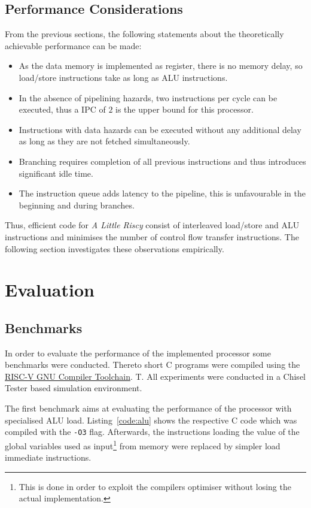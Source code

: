 \documentclass[conference]{IEEEtran}
\begin{document}
\subsection{Performance Considerations} \label{sec:performance}
From the previous sections, the following statements about the theoretically achievable performance can be made:
\begin{itemize}
	\item As the data memory is implemented as register, there is no memory delay, so load/store instructions take as long as ALU instructions.
	\item In the absence of pipelining hazards, two instructions per cycle can be executed, thus a IPC of $2$ is the upper bound for this processor.
	\item Instructions with data hazards can be executed without any additional delay as long as they are not fetched simultaneously.
	\item Branching requires completion of all previous instructions and thus introduces significant idle time.
	\item The instruction queue adds latency to the pipeline, this is unfavourable in the beginning and during branches.
\end{itemize}

Thus, efficient code for \emph{A Little Riscy} consist of interleaved load/store and ALU instructions and minimises the number of control flow transfer instructions. The following section investigates these observations empirically.

\section{Evaluation} \label{sec:eval}

\subsection{Benchmarks}

In order to evaluate the performance of the implemented processor some benchmarks were conducted. Thereto short C programs were compiled using the \href{https://github.com/riscv/riscv-gnu-toolchain}{RISC-V GNU Compiler Toolchain}. T. All experiments were conducted in a Chisel Tester based simulation environment.
 
The first benchmark aims at evaluating the performance of the processor with specialised ALU load. Listing~\ref{code:alu} shows the respective C code which was compiled with the \verb|-O3| flag. Afterwards, the instructions loading the value of the global variables used as input\footnote{This is done in order to exploit the compilers optimiser without losing the actual implementation.} from memory were replaced by simpler load immediate instructions.
\end{document}

